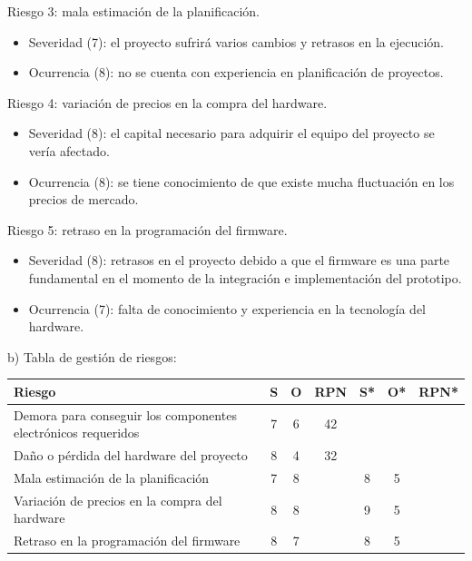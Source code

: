 \documentclass[
11pt, %
]{charter}
\begin{document}
Riesgo 3: mala estimación de la planificación.
\begin{itemize}
	\item Severidad (7): el proyecto sufrirá varios cambios y retrasos en la ejecución.\\
	\item Ocurrencia (8): no se cuenta con experiencia en planificación de proyectos.\\
\end{itemize}

Riesgo 4: variación de precios en la compra del hardware.
\begin{itemize}
	\item Severidad (8): el capital necesario para adquirir el equipo del proyecto se vería afectado.\\
	\item Ocurrencia (8): se tiene conocimiento de que existe mucha fluctuación en los precios de mercado.\\
\end{itemize}

Riesgo 5: retraso en la programación del firmware.
\begin{itemize}
	\item Severidad (8): retrasos en el proyecto debido a que el firmware es una parte fundamental en el momento de la integración e implementación del prototipo.\\
	\item Ocurrencia (7): falta de conocimiento y experiencia en la tecnología del hardware.\\
\end{itemize}

b) Tabla de gestión de riesgos:

\begin{table}[htpb]
\centering
\begin{tabularx}{\linewidth}{@{}|X|c|c|c|c|c|c|@{}}
\hline
\rowcolor[HTML]{C0C0C0} 
Riesgo & S & O & RPN & S* & O* & RPN* \\ \hline
Demora para conseguir los componentes electrónicos requeridos & 7 & 6 & 42  &    &    &      \\ \hline
Daño o pérdida del hardware del proyecto & 8 & 4 & 32  &    &    &      \\ \hline
Mala estimación de la planificación & 7 & 8 & \cellcolor{red}{56}  & 8  & 5  & \cellcolor{green}{40}   \\ \hline
Variación de precios en la compra del hardware & 8 & 8 & \cellcolor{red}{64}  & 9 & 5  & \cellcolor{green}{45}   \\ \hline
Retraso en la programación del firmware & 8 & 7 & \cellcolor{red}{56}  & 8  & 5  & \cellcolor{green}{40}   \\ \hline
\end{tabularx}%
\end{table}
\end{document}
